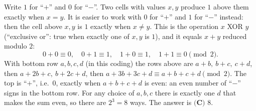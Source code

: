 Write $1$ for ``$+$'' and $0$ for ``$-$''. Two cells with values $x,y$ produce $1$ above them exactly when $x=y$. It is easier to work with $0$ for ``$+$'' and $1$ for ``$-$'' instead: then the cell above $x,y$ is $1$ exactly when $x\ne y$. This is the operation $x$ XOR $y$ (``exclusive or'': true when exactly one of $x,y$ is $1$), and it equals $x+y$ reduced modulo $2$:
\[
0+0\equiv0,\quad0+1\equiv1,\quad1+0\equiv1,\quad1+1\equiv0\pmod2 .
\]
With bottom row $a,b,c,d$ (in this coding) the rows above are $a+b,\ b+c,\ c+d$, then $a+2b+c,\ b+2c+d$, then $a+3b+3c+d\equiv a+b+c+d\pmod 2$. The top is ``$+$'', i.e.\ $0$, exactly when $a+b+c+d$ is even: an even number of ``$-$'' signs in the bottom row. For any choice of $a,b,c$ there is exactly one $d$ that makes the sum even, so there are $2^3=8$ ways. The answer is $\boxed{\textbf{(C) } 8}$.
